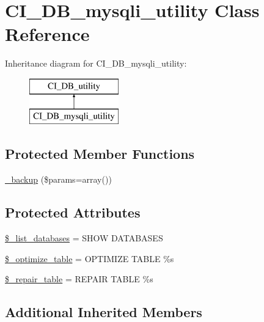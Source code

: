 \hypertarget{class_c_i___d_b__mysqli__utility}{}\section{C\+I\+\_\+\+D\+B\+\_\+mysqli\+\_\+utility Class Reference}
\label{class_c_i___d_b__mysqli__utility}
Inheritance diagram for C\+I\+\_\+\+D\+B\+\_\+mysqli\+\_\+utility\+:\begin{figure}[H]
\begin{center}
\leavevmode
\includegraphics[height=2.000000cm]{class_c_i___d_b__mysqli__utility}
\end{center}
\end{figure}
\subsection*{Protected Member Functions}
\begin{DoxyCompactItemize}
\item 
\mbox{\hyperlink{class_c_i___d_b__mysqli__utility_a30f3053d2c82e7562349924363507afa}{\+\_\+backup}} (\$params=array())
\end{DoxyCompactItemize}
\subsection*{Protected Attributes}
\begin{DoxyCompactItemize}
\item 
\mbox{\hyperlink{class_c_i___d_b__mysqli__utility_afe3a5b80562d93d6bc7e2b53c95b7e5a}{\$\+\_\+list\+\_\+databases}} = \textquotesingle{}S\+H\+OW D\+A\+T\+A\+B\+A\+S\+ES\textquotesingle{}
\item 
\mbox{\hyperlink{class_c_i___d_b__mysqli__utility_a083199e5c22c78912dae0a47bb2d7fad}{\$\+\_\+optimize\+\_\+table}} = \textquotesingle{}O\+P\+T\+I\+M\+I\+ZE T\+A\+B\+LE \%s\textquotesingle{}
\item 
\mbox{\hyperlink{class_c_i___d_b__mysqli__utility_a5cf925cbd52e3f6ba5b7ada3fa436efc}{\$\+\_\+repair\+\_\+table}} = \textquotesingle{}R\+E\+P\+A\+IR T\+A\+B\+LE \%s\textquotesingle{}
\end{DoxyCompactItemize}
\subsection*{Additional Inherited Members}


